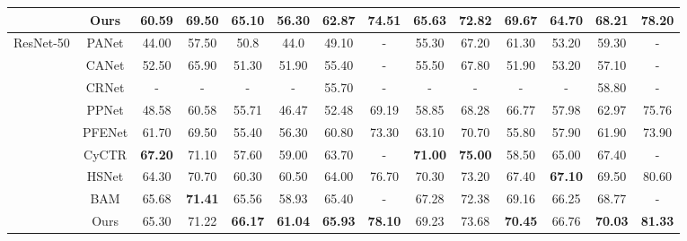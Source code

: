 \documentclass[conference]{IEEEtran}
\begin{document}
\begin{table*}[t]
\begin{center}
{\begin{tabular}{cc|cccccc|cccccc}
                           & Ours                     & \textbf{60.59}  & \textbf{69.50}  & \textbf{65.10}  & \textbf{56.30}  & \textbf{62.87}  & \textbf{74.51}    & \textbf{65.63}  & \textbf{72.82}  & \textbf{69.67}  & \textbf{64.70}  & \textbf{68.21}  & \textbf{78.20}    \\ \hline

\multirow{10}{*}{ResNet-50} & PANet\cite{PANet}                   & 44.00  & 57.50  & 50.8   & 44.0   & 49.10  & -        & 55.30  & 67.20  & 61.30  & 53.20  & 59.30  & -        \\

                           & CANet\cite{RN10}                   & 52.50  & 65.90  & 51.30  & 51.90  & 55.40  & -        & 55.50  & 67.80  & 51.90  & 53.20  & 57.10  & -        \\

                           & CRNet\cite{CRNet}                   & -      & -      & -      & -      & 55.70  & -        & -      & -      & -      & -      & 58.80  & -        \\

                           & PPNet\cite{Part-aware-prototype}                   & 48.58  & 60.58  & 55.71  & 46.47  & 52.48  & 69.19    & 58.85  & 68.28  & 66.77  & 57.98  & 62.97  & 75.76    \\

                           & PFENet\cite{PFENet}                  & 61.70  & 69.50  & 55.40  & 56.30  & 60.80  & 73.30    & 63.10  & 70.70  & 55.80  & 57.90  & 61.90  & 73.90    \\

                           & CyCTR\cite{CyCTR}                   & \textbf{67.20}  & 71.10  & 57.60  & 59.00  & 63.70  & -        & \textbf{71.00}  & \textbf{75.00}  & 58.50  & 65.00  & 67.40  & -        \\

                           & HSNet\cite{HSNet}                   & 64.30  & 70.70  & 60.30  & 60.50  & 64.00  & 76.70    & 70.30  & 73.20  & 67.40  & \textbf{67.10}  & 69.50  & 80.60    \\

                           & BAM\cite{BAM}                     & 65.68  & \textbf{71.41}  & 65.56  & 58.93  & 65.40  & -    & 67.28  & 72.38  & 69.16  & 66.25  & 68.77  & -    \\ \cline{2-14}

                           & Ours                     & 65.30  & 71.22  & \textbf{66.17}  & \textbf{61.04}  & \textbf{65.93}  & \textbf{78.10}    & 69.23  & 73.68  & \textbf{70.45}  & 66.76  & \textbf{70.03}  & \textbf{81.33}    \\ \hline

\end{tabular}
}

\end{center}

\end{table*}
\end{document}
